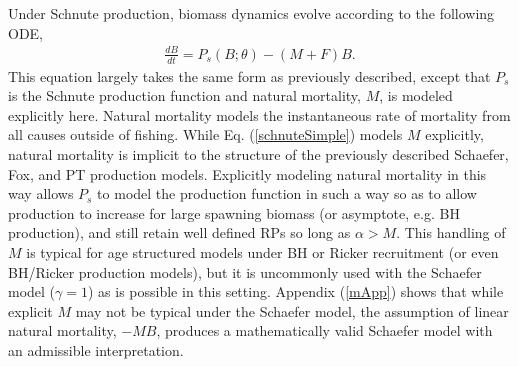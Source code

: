 %
Under Schnute production, biomass dynamics evolve according to the following ODE,
%
\begin{align}
\frac{dB}{dt} = P_s(B;\theta) - (M+F)B. \label{schnuteSimple}
\end{align}
%
This equation largely takes the same form as previously described, except
that $P_s$ is the Schnute production function and natural mortality, $M$, is modeled
explicitly here. %
Natural mortality models the instantaneous rate of mortality from all causes
outside of fishing. While Eq. (\ref{schnuteSimple}) models $M$ explicitly,
natural mortality is implicit to the structure of the previously described
Schaefer, Fox, and PT production models. Explicitly modeling natural mortality 
in this way allows $P_s$ to model the production function in such a way so as to allow 
production to increase for large spawning biomass (or asymptote, e.g. BH production), 
and still retain well defined RPs so long as $\alpha>M$. %
This handling of $M$ is typical for age structured models under BH or Ricker 
recruitment (or even BH/Ricker production models), but it is uncommonly used with the 
Schaefer model ($\gamma=1$) as is possible in this setting. Appendix (\ref{mApp}) 
shows that while explicit $M$ may not be typical under the Schaefer model, the 
assumption of linear natural mortality, $-MB$, produces a mathematically valid 
Schaefer model with an admissible interpretation.  




